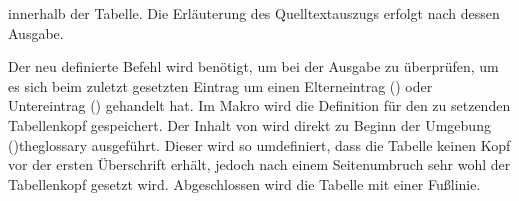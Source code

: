 \documentclass[%
  english,ngerman,%
  cdgeometry=no,DIV=12,%
  cd=false,cdfont=false,cdtitle=true,%
  headings=normal,%
  automark,%
  listof=toc,%
]{tudscrartcl}
\begin{document}
innerhalb der Tabelle. Die Erläuterung des Quelltextauszugs erfolgt nach dessen 
Ausgabe.
%
\CodeHook{\let\newglossarystyle\renewglossarystyle}
\begin{Hint*}
\end{Hint*}
%
Der neu definierte Befehl  wird benötigt, um bei der 
Ausgabe zu überprüfen, um es sich beim zuletzt gesetzten Eintrag um einen 
Elterneintrag () oder Untereintrag () 
gehandelt hat. Im Makro  wird die Definition für den zu 
setzenden Tabellenkopf gespeichert. Der Inhalt von  wird 
direkt zu Beginn der Umgebung \Environment(){theglossary} 
ausgeführt. Dieser wird so umdefiniert, dass die Tabelle keinen Kopf vor der 
ersten Überschrift erhält, jedoch nach einem Seitenumbruch sehr wohl der 
Tabellenkopf gesetzt wird. Abgeschlossen wird die Tabelle mit einer Fußlinie.
\end{document}
